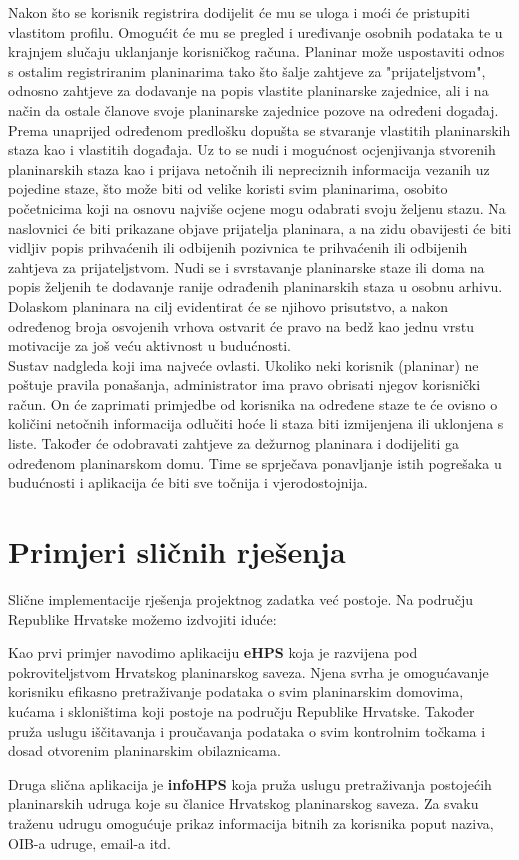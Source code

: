 		Nakon što se korisnik registrira dodijelit će mu se uloga  i moći će pristupiti vlastitom profilu. Omogućit će mu se pregled i uređivanje osobnih podataka te u krajnjem slučaju uklanjanje korisničkog računa. Planinar može uspostaviti odnos s ostalim registriranim planinarima tako što šalje zahtjeve za "prijateljstvom", odnosno zahtjeve za dodavanje na popis vlastite planinarske zajednice, ali i na način da ostale članove svoje planinarske zajednice pozove na određeni događaj. Prema unaprijed određenom predlošku dopušta se stvaranje vlastitih planinarskih staza kao i vlastitih događaja. Uz to se nudi i mogućnost ocjenjivanja stvorenih planinarskih staza kao i prijava netočnih ili nepreciznih informacija vezanih uz pojedine staze, što može biti od velike koristi svim planinarima, osobito početnicima koji na osnovu najviše ocjene mogu odabrati svoju željenu stazu. Na naslovnici će biti prikazane objave prijatelja planinara, a na zidu obavijesti će biti vidljiv popis prihvaćenih ili odbijenih pozivnica te prihvaćenih ili odbijenih zahtjeva za prijateljstvom. Nudi se i svrstavanje planinarske staze ili doma na popis željenih te dodavanje ranije odrađenih planinarskih staza u osobnu arhivu. Dolaskom planinara na cilj evidentirat će se njihovo prisutstvo, a nakon određenog broja osvojenih vrhova ostvarit će pravo na bedž kao jednu vrstu motivacije za još veću aktivnost u budućnosti. \\
		
		Sustav nadgleda  koji ima najveće ovlasti. Ukoliko neki korisnik (planinar) ne poštuje pravila ponašanja, administrator ima pravo obrisati njegov korisnički račun. On će zaprimati primjedbe od korisnika na određene staze te će ovisno o količini netočnih informacija odlučiti hoće li staza biti izmijenjena ili uklonjena s liste. Također će odobravati zahtjeve za dežurnog planinara i dodijeliti ga određenom planinarskom domu. Time se sprječava ponavljanje istih pogrešaka u budućnosti i aplikacija će biti sve točnija i vjerodostojnija. 
		
		
		\section{Primjeri sličnih rješenja}
		Slične implementacije rješenja projektnog zadatka već postoje. Na području Republike Hrvatske možemo izdvojiti iduće: 
		\begin{packed_enum}
			\item Kao prvi primjer navodimo aplikaciju \textbf{eHPS} koja je razvijena pod pokroviteljstvom Hrvatskog planinarskog saveza. Njena svrha je omogućavanje korisniku efikasno pretraživanje podataka o svim planinarskim domovima, kućama i skloništima koji postoje na području Republike Hrvatske. Također pruža uslugu iščitavanja i proučavanja podataka o svim kontrolnim točkama i dosad otvorenim planinarskim obilaznicama.
			\item Druga slična aplikacija je \textbf{infoHPS} koja pruža uslugu pretraživanja postojećih planinarskih udruga koje su članice Hrvatskog planinarskog saveza. Za svaku traženu udrugu omogućuje prikaz informacija bitnih za korisnika poput naziva, OIB-a udruge, email-a itd. 
		\end{packed_enum}
	

